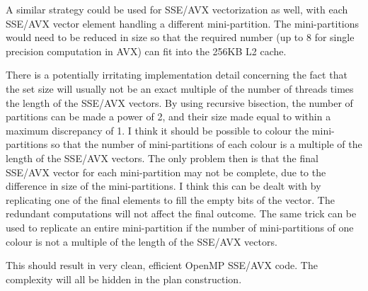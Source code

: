 \documentclass[12pt]{article}
\begin{document}
A similar strategy could be used for SSE/AVX vectorization as well, 
with each SSE/AVX vector element handling a different mini-partition. 
The mini-partitions would need to be reduced in size so that the 
required number (up to 8 for single precision computation in AVX) 
can fit into the 256KB L2 cache.

There is a potentially irritating implementation detail concerning the 
fact that the set size will usually not be an exact multiple of the number 
of threads times the length of the SSE/AVX vectors.  By using recursive 
bisection, the number of partitions can be made a power of 2, and their 
size made equal to within a maximum discrepancy of 1.  I think it should 
be possible to colour the mini-partitions so that the number of 
mini-partitions of each colour is a multiple of the length of the SSE/AVX 
vectors.  The only problem then is that the final SSE/AVX vector for
each mini-partition may not be complete, due to the difference in size of
the mini-partitions.  I think this can be dealt with by replicating one 
of the final elements to fill the empty bits of the vector.  The redundant 
computations will not affect the final outcome.  The same trick can be 
used to replicate an entire mini-partition if the number of mini-partitions 
of one colour is not a multiple of the length of the SSE/AVX vectors. 

This should result in very clean, efficient OpenMP SSE/AVX code.  The 
complexity will all be hidden in the plan construction.
\end{document}
